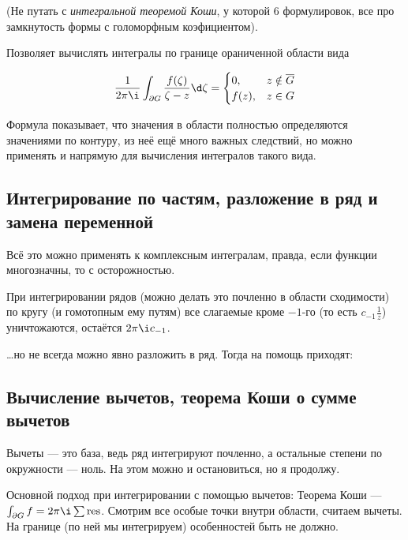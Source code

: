 \documentclass[12pt, a4paper]{article}
\begin{document}
(Не путать с \textit{интегральной теоремой Коши}, у которой 6 формулировок, все про замкнутость формы с голоморфным коэфициентом).

Позволяет вычислять интегралы по границе ораниченной области вида 

\begin{equation}
  \frac{1}{2 \pi \i}\int_{\partial G} \frac{f(\zeta)}{\zeta - z} \d\zeta = \begin{cases}
    0, & z \notin \overline{G} \\
    f(z), & z \in G
  \end{cases}
\end{equation}

Формула показывает, что значения в области полностью определяются значениями по контуру, 
из неё ещё много важных следствий, 
но можно применять и напрямую для вычисления интегралов такого вида.

\subsection{Интегрирование по частям, разложение в ряд и замена переменной}

Всё это можно применять к комплексным интегралам, правда, если функции многозначны, то с осторожностью.

При интегрировании рядов (можно делать это почленно в области сходимости) по кругу (и гомотопным ему путям) 
все слагаемые кроме $-1$-го (то есть $c_{-1}\frac{1}{z}$) уничтожаются, остаётся $2 \pi \i c_{-1}$.

…но не всегда можно явно разложить в ряд. Тогда на помощь приходят:

\subsection{Вычисление вычетов, теорема Коши о сумме вычетов}

Вычеты — это база, ведь ряд интегрируют почленно, а остальные степени по окружности — ноль.
На этом можно и остановиться, но я продолжу.

Основной подход при интегрировании с помощью вычетов: Теорема Коши — $\int_{\partial G} f = 2\pi \i \sum \operatorname{res}$. Смотрим все особые точки внутри области, считаем вычеты. 
На границе (по ней мы интегрируем) особенностей быть не должно.
\end{document}

